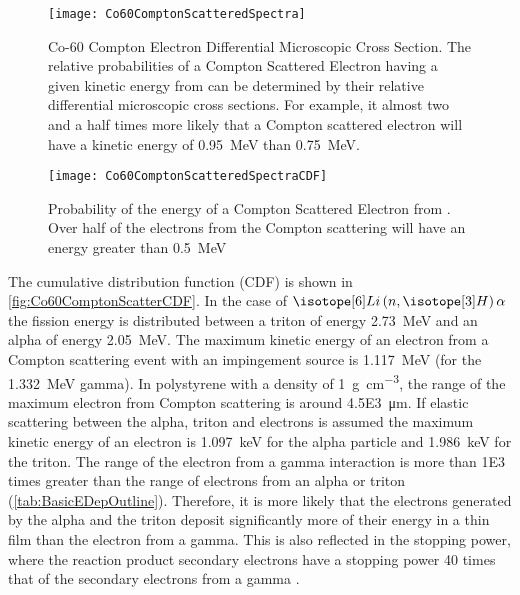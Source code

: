 \begin{figure}
  \centering
    \texttt{[image: Co60ComptonScatteredSpectra]}
    \caption[Analytical Co-60 Compton Electron Differential Microscopic Cross Section]{Co-60 Compton Electron Differential Microscopic Cross Section. The relative probabilities of a Compton Scattered Electron having a given kinetic energy from  can be determined by their relative differential microscopic cross sections. For example, it almost two and a half times more likely that a Compton scattered electron will have a kinetic energy of \SI{0.95}{\MeV} than \SI{0.75}{\MeV}.}
    \label{fig:Co60ComptonScatterSpectra}
  \end{figure}
\begin{figure}
    \texttt{[image: Co60ComptonScatteredSpectraCDF]}
    \caption[Analytical Co-60 Compton Electron Kinetic Energy Cumulative Distribution]{Probability of the energy of a Compton Scattered Electron from . Over half of the electrons from the Compton scattering will have an energy greater than \SI{0.5}{\MeV}}
    \label{fig:Co60ComptonScatterCDF}
\end{figure}
The cumulative distribution function (CDF) is shown in \autoref{fig:Co60ComptonScatterCDF}.
In the case of $\iso[6]{Li}\left(n,\iso[3]{H}\right)\alpha$ the fission energy is distributed between a triton of energy \SI{2.73}{\mega\eV} and an alpha of energy \SI{2.05}{\mega\eV}.
The maximum kinetic energy of an electron from a Compton scattering event with an impingement  source is \SI{1.117}{\mega\eV} (for the \SI{1.332}{\mega\eV} gamma). 
In polystyrene with a density of \SI{1}{\gram\per\cm\cubed}, the range of the maximum electron from Compton scattering is around \SI{4.5E3}{\um}\cite{berger_estar_2005}.
If elastic scattering between the alpha, triton and electrons is assumed the maximum kinetic energy of an electron is \SI{1.097}{\kilo\eV} for the alpha particle and \SI{1.986}{\kilo\eV} for the triton\cite{turner_atoms_2008}.
The range of the electron from a gamma interaction is more than \num{1E3} times greater than the range of electrons from an alpha or triton (\autoref{tab:BasicEDepOutline}).
Therefore, it is more likely that the electrons generated by the alpha and the triton deposit significantly more of their energy in a thin film than the electron from a gamma.
This is also reflected in the stopping power, where the reaction product secondary electrons have a stopping power 40 times that of the secondary electrons from a gamma \cite{berger_estar_2005}.

